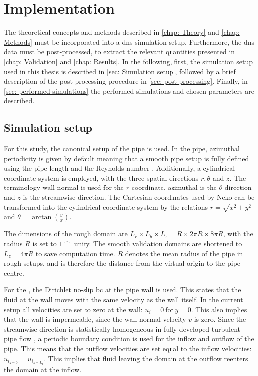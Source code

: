 \chapter{Implementation}\label{chap: application}

The theoretical concepts and methods described in \autoref{chap: Theory} and \autoref{chap: Methods} must be incorporated into a \acrshort{dns} simulation setup. 
Furthermore, the \acrshort{dns} data must be post-processed, to extract the relevant quantities presented in \autoref{chap: Validation} and \autoref{chap: Results}.
In the following, first, the simulation setup used in this thesis is described in \autoref{sec: Simulation setup}, followed by a brief description of the post-processing procedure in \autoref{sec: post-processing}.
Finally, in \autoref{sec: performed simulations} the performed simulations and chosen parameters are described.

\section{Simulation setup}\label{sec: Simulation setup}
For this study, the canonical setup of the pipe is used.
In the pipe, azimuthal periodicity is given by default meaning that a smooth pipe setup is fully defined using the pipe length and the Reynolds-number \citep{yaoDirectNumericalSimulations2023}.
Additionally, a cylindrical coordinate system is employed, with the three spatial directions $r, \theta$ and $z$.
The terminology wall-normal is used for the $r$-coordinate, azimuthal is the $\theta$ direction and $z$ is the streamwise direction.
The Cartesian coordinates used by Neko can be transformed into the cylindrical coordinate system by the relations $r = \sqrt{x^2 + y^2}$ and $\theta = \arctan\!\left(\frac{y}{x}\right)$.

The dimensions of the rough domain are $L_r \times L_\theta \times L_z = R \times 2\pi R \times 8\pi R$, with the radius $R$ is set to $1 \hat{=}$ unity. 
The smooth validation domains are shortened to $L_z = 4\pi R$ to save computation time.
$R$ denotes the mean radius of the pipe in rough setups, and is therefore the distance from the virtual origin to the pipe centre.

For the , the Dirichlet no-slip \acrshort{bc} at the pipe wall is used.
This states that the fluid at the wall  moves with the same velocity as the wall itself.
In the current setup all velocities are set to zero at the wall: $u_i = 0 \ \text{for}\ y = 0$.
This also implies that the wall is impermeable, since the wall normal velocity $v$ is zero.
Since the streamwise direction is statistically homogeneous in fully developed turbulent pipe flow \citep{moinDIRECTNUMERICALSIMULATION1998}, a periodic boundary condition is used for the inflow and outflow of the pipe.
This means that the outflow velocities are set equal to the inflow velocities: $u_{i_{z = 0}} = u_{i_{z=L_z}}$.
This implies that fluid leaving the domain at the outflow reenters the domain at the inflow.

